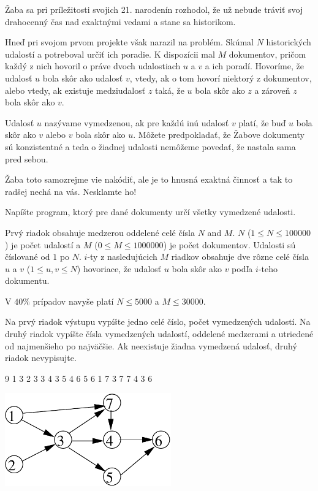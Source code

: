 





Žaba sa pri príležitosti svojich 21. narodenín rozhodol,
že už nebude tráviť svoj drahocenný čas nad exaktnými vedami
a stane sa historikom.

Hneď pri svojom prvom projekte však narazil na problém.
Skúmal $N$ historických udalostí
a potreboval určiť ich poradie.
K dispozícii mal $M$ dokumentov,
pričom každý z nich hovoril o práve dvoch udalostiach $u$ a $v$
a ich poradí.
Hovoríme, že udalosť $u$ bola skôr ako udalosť $v$,
vtedy, ak o tom hovorí niektorý z dokumentov,
alebo vtedy, ak existuje medziudalosť $z$ taká,
že $u$ bola skôr ako $z$ a zároveň $z$ bola skôr ako $v$.

Udalosť $u$ nazývame vymedzenou, ak pre každú inú udalosť $v$ platí,
že buď $u$ bola skôr ako $v$ alebo $v$ bola skôr ako $u$.
Môžete predpokladať, že Žabove dokumenty sú konzistentné
a teda o žiadnej udalosti nemôžeme povedať, že nastala sama pred sebou.

Žaba toto samozrejme vie nakódiť, ale je to hnusná exaktná činnosť
a tak to radšej nechá na vás. Nesklamte ho!

Napíšte program, ktorý pre dané dokumenty určí všetky vymedzené udalosti.

Prvý riadok obsahuje medzerou oddelené celé čísla $N$ and $M$.
$N$ ($1 \leq N \leq 100000$) je počet udalostí
a $M$ ($0 \leq M \leq 1000000$) je počet dokumentov.
Udalosti sú číslované od $1$ po $N$.
$i$-ty z nasledujúcich $M$ riadkov obsahuje
dve rôzne celé čísla $u$ a $v$ ($1 \leq u, v \leq N$)
hovoriace, že udalosť $u$ bola skôr ako $v$
podľa $i$-teho dokumentu.
\bigskip

V $40 \%$ prípadov navyše platí $N \leq 5000$ a $M \leq 30000$.

Na prvý riadok výstupu vypíšte jedno celé číslo, počet vymedzených udalostí.
Na druhý riadok vypíšte čísla vymedzených udalostí,
oddelené medzerami
a utriedené od najmenšieho po najväčšie.
Ak neexistuje žiadna vymedzená udalosť, druhý riadok nevypisujte.


 9
1 3
2 3
3 4
3 5
4 6
5 6
1 7
3 7
7 4
3 6
\sampleCOMMENT

\sampleEND

\includegraphics[height=4cm]{img/critical-fig.pdf}
\bigskip



